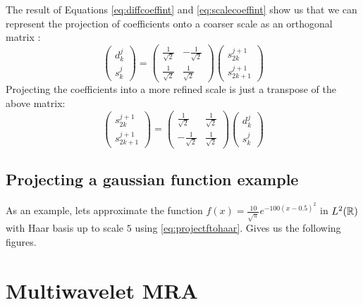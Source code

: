 \documentclass[../master_thesis.tex]{subfiles}
\begin{document}
The result of Equations \ref{eq:diffcoeffint} and \ref{eq:scalecoeffint} show us
that we can represent the projection of coefficients onto a coarser scale as an
orthogonal matrix \cite{Sorland, Beylkin:MRA}:
\begin{equation}
  \begin{pmatrix}
    d^{j}_k \\
    s^{j}_k
  \end{pmatrix} =
  \begin{pmatrix}
    \frac{1}{\sqrt{2}} & -\frac{1}{\sqrt{2}} \\
    \frac{1}{\sqrt{2}} & \frac{1}{\sqrt{2}}
  \end{pmatrix}
  \begin{pmatrix}
    s^{j+1}_{2k} \\
    s^{j+1}_{2k+1}
  \end{pmatrix}
\end{equation}
Projecting the coefficients into a more refined scale is just a transpose of the
above matrix:
\begin{equation}
  \begin{pmatrix}
    s^{j+1}_{2k} \\
    s^{j+1}_{2k+1}
  \end{pmatrix} =
  \begin{pmatrix}
    \frac{1}{\sqrt{2}} & \frac{1}{\sqrt{2}} \\
    -\frac{1}{\sqrt{2}} & \frac{1}{\sqrt{2}}
  \end{pmatrix}
  \begin{pmatrix}
    d^{j}_k \\
    s^{j}_k
  \end{pmatrix}
\end{equation}
\subsection{Projecting a gaussian function example}
As an example, lets approximate the function
$f(x) = \frac{10}{\sqrt{\pi}}e^{-100(x - 0.5)^2}$ in $L^2(\mathbb{R})$
with Haar basis up to scale $5$ using \ref{eq:projectftohaar}. Gives us the
following figures.

\section{Multiwavelet \ac{MRA}}
\end{document}
